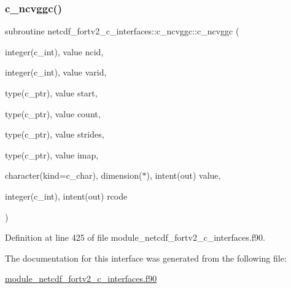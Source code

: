 \subsubsection{\texorpdfstring{c\+\_\+ncvggc()}{c\_ncvggc()}}
{\footnotesize\ttfamily subroutine netcdf\+\_\+fortv2\+\_\+c\+\_\+interfaces\+::c\+\_\+ncvggc\+::c\+\_\+ncvggc (\begin{DoxyParamCaption}\item[{integer(c\+\_\+int), value}]{ncid,  }\item[{integer(c\+\_\+int), value}]{varid,  }\item[{type(c\+\_\+ptr), value}]{start,  }\item[{type(c\+\_\+ptr), value}]{count,  }\item[{type(c\+\_\+ptr), value}]{strides,  }\item[{type(c\+\_\+ptr), value}]{imap,  }\item[{character(kind=c\+\_\+char), dimension($\ast$), intent(out)}]{value,  }\item[{integer(c\+\_\+int), intent(out)}]{rcode }\end{DoxyParamCaption})}



Definition at line 425 of file module\+\_\+netcdf\+\_\+fortv2\+\_\+c\+\_\+interfaces.\+f90.



The documentation for this interface was generated from the following file\+:\begin{DoxyCompactItemize}
\item 
\hyperlink{module__netcdf__fortv2__c__interfaces_8f90}{module\+\_\+netcdf\+\_\+fortv2\+\_\+c\+\_\+interfaces.\+f90}\end{DoxyCompactItemize}
